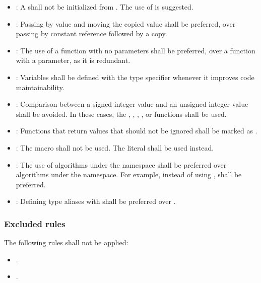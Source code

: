 \begin{itemize}
\item {}:
A  shall not be initialized from .
The use of  is suggested.

\item {}:
Passing by value and moving the copied value shall be preferred, over
passing by constant reference followed by a copy.

\item {}:
The use of a function with no parameters shall be preferred, over a
function with a  parameter, as it is redundant.

\item {}:
Variables shall be defined with the  type specifier whenever it
improves code maintainability.

\item {}:
Comparison between a signed integer value and an unsigned integer value shall be
avoided. In these cases, the ,
, , ,
 or  functions shall be
used.

\item {}:
Functions that return values that should not be ignored shall be marked as
\cppkey{[[nodiscard]]}.

\item {}:
The  macro shall not be used.
The  literal shall be used instead.

\item {}:
The use of algorithms under the  namespace shall be
preferred over algorithms under the  namespace. For example, instead
of using , 
shall be preferred.

\item {}:
Defining type aliases with  shall be preferred over
.
\end{itemize}

\subsubsection{Excluded rules}

The following rules shall not be applied:

\begin{itemize}

\item {}.
\item {}.

\end{itemize}
